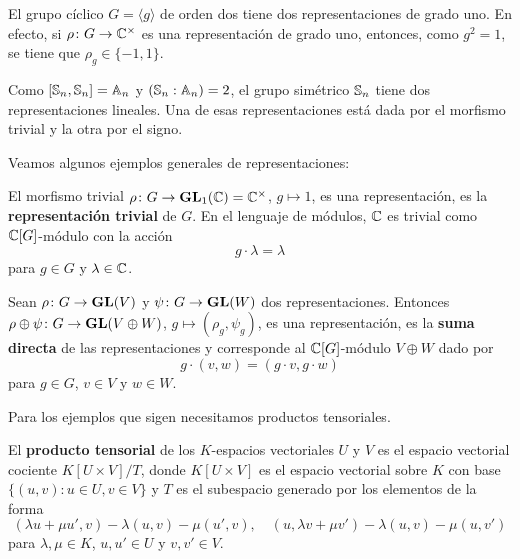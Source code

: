 
\begin{example}
  El grupo cíclico $G=\langle g\rangle$ de orden dos tiene dos representaciones de grado uno. En efecto, 
  si $\rho\colon G\to\mathbb{C}^{\times}$ es una representación de grado uno, entonces, como $g^2=1$, se tiene que
  $\rho_g\in\{-1,1\}$. 
\end{example}

\begin{example}
    Como $[\mathbb{S}_n,\mathbb{S}_n]=\mathbb{A}_n$ y $(\mathbb{S}_n:\mathbb{A}_n)=2$, el grupo 
    simétrico $\mathbb{S}_n$ tiene dos representaciones lineales. 
    Una de esas representaciones está dada por el morfismo trivial y la otra por el signo. 
\end{example}

Veamos algunos ejemplos generales de representaciones:

\begin{example}
    El morfismo trivial $\rho\colon G\to\mathbf{GL}_1(\mathbb{C})=\mathbb{C}^{\times}$, $g\mapsto 1$, es una representación, 
    es la \textbf{representación trivial} de $G$. En el lenguaje de módulos, 
	$\mathbb{C}$ es trivial como $\mathbb{C}[G]$-módulo con la acción
	\[
	g\cdot \lambda=\lambda
	\]
	para $g\in G$ y $\lambda\in\mathbb{C}$.
\end{example}

\begin{example}
  Sean $\rho\colon G\to\mathbf{GL}(V)$ y $\psi\colon G\to\mathbf{GL}(W)$ dos representaciones.
  Entonces $\rho\oplus\psi\colon G\to\mathbf{GL}(V\oplus W)$, $g\mapsto (\rho_g,\psi_g)$, 
  es una representación, es la 
  \textbf{suma directa} de las representaciones y corresponde al $\mathbb{C}[G]$-módulo 
  $V\oplus W$ dado por 
  \[
  g\cdot (v,w)=(g\cdot v,g\cdot w)
  \]
  para $g\in G$, $v\in V$ y $w\in W$. 
\end{example}

Para los ejemplos que sigen 
necesitamos productos tensoriales. 

El \textbf{producto tensorial} de los $K$-espacios vectoriales $U$ y $V$ es
el espacio vectorial cociente $K[U\times V]/T$, donde $K[U\times V]$ es el
espacio vectorial sobre $K$ con base $\{(u,v):u\in U,v\in V\}$ y $T$ es el subespacio
generado por los elementos de la forma
	\[
		(\lambda u+\mu u',v)-\lambda(u,v)-\mu(u',v),\quad
		(u,\lambda v+\mu v')-\lambda(u,v)-\mu(u,v')
	\]
	para $\lambda,\mu\in K$, $u,u'\in U$ y $v,v'\in V$.

